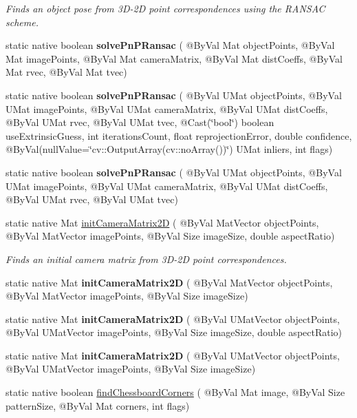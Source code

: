 \begin{DoxyCompactItemize}
\begin{DoxyCompactList}\small\item\em Finds an object pose from 3\+D-\/2D point correspondences using the R\+A\+N\+S\+AC scheme. \end{DoxyCompactList}\item 
static native boolean {\bfseries solve\+Pn\+P\+Ransac} ( @By\+Val Mat object\+Points, @By\+Val Mat image\+Points, @By\+Val Mat camera\+Matrix, @By\+Val Mat dist\+Coeffs, @By\+Val Mat rvec, @By\+Val Mat tvec)
\item 
static native boolean {\bfseries solve\+Pn\+P\+Ransac} ( @By\+Val U\+Mat object\+Points, @By\+Val U\+Mat image\+Points, @By\+Val U\+Mat camera\+Matrix, @By\+Val U\+Mat dist\+Coeffs, @By\+Val U\+Mat rvec, @By\+Val U\+Mat tvec, @Cast(\char`\"{}bool\char`\"{}) boolean use\+Extrinsic\+Guess, int iterations\+Count, float reprojection\+Error, double confidence, @By\+Val(null\+Value=\char`\"{}cv\+::\+Output\+Array(cv\+::no\+Array())\char`\"{}) U\+Mat inliers, int flags)
\item 
static native boolean {\bfseries solve\+Pn\+P\+Ransac} ( @By\+Val U\+Mat object\+Points, @By\+Val U\+Mat image\+Points, @By\+Val U\+Mat camera\+Matrix, @By\+Val U\+Mat dist\+Coeffs, @By\+Val U\+Mat rvec, @By\+Val U\+Mat tvec)
\item 
static native Mat \hyperlink{group__calib3d_ga783c80e734c8368c9db31e3ad820f7fa}{init\+Camera\+Matrix2D} ( @By\+Val Mat\+Vector object\+Points, @By\+Val Mat\+Vector image\+Points, @By\+Val Size image\+Size, double aspect\+Ratio)
\begin{DoxyCompactList}\small\item\em Finds an initial camera matrix from 3\+D-\/2D point correspondences. \end{DoxyCompactList}\item 
static native Mat {\bfseries init\+Camera\+Matrix2D} ( @By\+Val Mat\+Vector object\+Points, @By\+Val Mat\+Vector image\+Points, @By\+Val Size image\+Size)
\item 
static native Mat {\bfseries init\+Camera\+Matrix2D} ( @By\+Val U\+Mat\+Vector object\+Points, @By\+Val U\+Mat\+Vector image\+Points, @By\+Val Size image\+Size, double aspect\+Ratio)
\item 
static native Mat {\bfseries init\+Camera\+Matrix2D} ( @By\+Val U\+Mat\+Vector object\+Points, @By\+Val U\+Mat\+Vector image\+Points, @By\+Val Size image\+Size)
\item 
static native boolean \hyperlink{group__calib3d_ga8736b25349ec9178b46c38128bd9d95a}{find\+Chessboard\+Corners} ( @By\+Val Mat image, @By\+Val Size pattern\+Size, @By\+Val Mat corners, int flags)

\end{DoxyCompactItemize}
